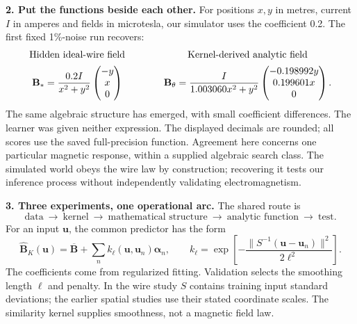 \documentclass[11pt,letterpaper]{article}
\begin{document}
\textbf{2. Put the functions beside each other.}
For positions $x,y$ in metres, current $I$ in amperes and fields in microtesla,
our simulator uses the coefficient 0.2. The first fixed 1\%-noise run recovers:
\begin{equation}
\begin{array}{c@{\qquad\qquad}c}
\text{Hidden ideal-wire field}&\text{Kernel-derived analytic field}\\[5pt]
\displaystyle\mathbf B_*=
\frac{0.2I}{x^2+y^2}\begin{pmatrix}-y\\x\\0\end{pmatrix}
&\displaystyle\mathbf B_\theta=
\frac{I}{\WireD x^2+y^2}
\begin{pmatrix}-\WireA y\\\WireB x\\0\end{pmatrix}.
\end{array}
\label{eq:pair}
\end{equation}
The same algebraic structure has emerged, with small coefficient differences.
The learner was given neither expression. The displayed decimals are rounded;
all scores use the saved full-precision function. Agreement here concerns one
particular magnetic response, within a supplied algebraic search class.
The simulated world obeys the wire law by construction; recovering it tests
our inference process without independently validating electromagnetism.

\newpage
\textbf{3. Three experiments, one operational arc.}
The shared route is
\begin{equation}
\text{data}\ \longrightarrow\ \text{kernel}
\ \longrightarrow\ \text{mathematical structure}
\ \longrightarrow\ \text{analytic function}\ \longrightarrow\ \text{test}.
\label{eq:workflow}
\end{equation}
For an input $\mathbf u$, the common predictor has the form
\begin{equation}
\widehat{\mathbf B}_K(\mathbf u)
=\overline{\mathbf B}+\sum_n k_\ell(\mathbf u,\mathbf u_n)\boldsymbol\alpha_n,
\qquad
k_\ell=\exp\!\left[-\frac{\|S^{-1}(\mathbf u-\mathbf u_n)\|^2}{2\ell^2}\right].
\label{eq:kernel}
\end{equation}
The coefficients come from regularized fitting. Validation selects the smoothing
length $\ell$ and penalty. In the wire study $S$ contains training input standard
deviations; the earlier spatial studies use their stated coordinate scales.
The similarity kernel supplies smoothness, not a magnetic field law.
\end{document}
